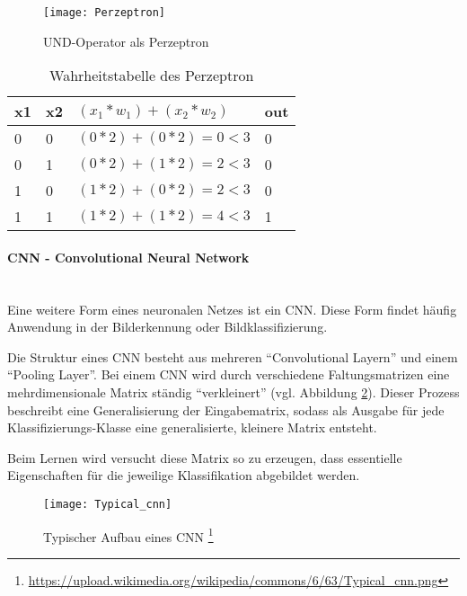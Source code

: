     \begin{figure}[H]
        \centering
        \texttt{[image: Perzeptron]}
        \caption{UND-Operator als Perzeptron \cite{DrawIO}}
        \label{fig:PerzeptronAND}
    \end{figure}

    \begin{table}[H]
        \centering
        \begin{tabular}{|l|l|l|l|}
            \hline
            x1 & x2 & \( (x_1 * w_1) + (x_2 * w_2) \) & out \\
            \hline
            0 & 0 & \( (0 * 2) + (0 * 2) = 0 < 3 \) & 0 \\
            \hline
            0 & 1 & \( (0 * 2) + (1 * 2) = 2 < 3 \) & 0 \\
            \hline
            1 & 0 & \( (1 * 2) + (0 * 2) = 2 < 3 \) & 0 \\
            \hline
            1 & 1 & \( (1 * 2) + (1 * 2) = 4 < 3 \) & 1 \\
            \hline
        \end{tabular}
        \caption{Wahrheitstabelle des Perzeptron}
        \label{tabl:Perzeptron}
    \end{table}

    \paragraph{CNN - Convolutional Neural Network}
    \cite[Vgl. im Folgenden]{Robotics2}\\
    Eine weitere Form eines neuronalen Netzes ist ein \ac{CNN}.
    Diese Form findet häufig Anwendung in der Bilderkennung oder Bildklassifizierung.
    \newline

    Die Struktur eines \ac{CNN} besteht aus mehreren "`Convolutional Layern"' und einem "`Pooling Layer"'.
    Bei einem \ac{CNN} wird durch verschiedene Faltungsmatrizen eine mehrdimensionale Matrix ständig "`verkleinert"' (vgl. Abbildung \ref{fig:Typisch_CNN}).
    Dieser Prozess beschreibt eine Generalisierung der Eingabematrix, sodass als Ausgabe für jede Klassifizierungs-Klasse eine generalisierte, kleinere Matrix entsteht.
    
    Beim Lernen wird versucht diese Matrix so zu erzeugen, dass essentielle Eigenschaften für die jeweilige Klassifikation abgebildet werden.

    \begin{figure}[H]
        \centering
        \texttt{[image: Typical\_cnn]}
        \caption[Typischer Aufbau eines CNN]{Typischer Aufbau eines \ac{CNN} \footnote{\url{https://upload.wikimedia.org/wikipedia/commons/6/63/Typical_cnn.png}} }
        \label{fig:Typisch_CNN}
    \end{figure}



